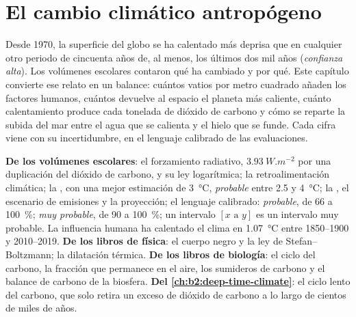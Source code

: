 \chapter{El cambio climático antropógeno}\label{ch:b2:anthropogenic-climate-change}

Desde 1970, la superficie del globo se ha calentado más deprisa que en cualquier otro periodo de cincuenta años de, al menos,
los últimos dos mil años (\emph{confianza alta}). Los volúmenes escolares contaron qué ha cambiado y
por qué. Este capítulo convierte ese relato en un balance: cuántos vatios por metro cuadrado añaden los
factores humanos, cuántos devuelve al espacio el planeta más caliente, cuánto calentamiento produce cada tonelada de dióxido
de carbono y cómo se reparte la subida del mar entre el agua que se calienta y el hielo que se funde. Cada cifra
viene con su incertidumbre, en el lenguaje calibrado de las evaluaciones.

\begin{recall}
\textbf{De los volúmenes escolares}: el forzamiento radiativo, $\qty{3.93}{W.m^{-2}}$ por una duplicación del
dióxido de carbono, y su ley logarítmica; la retroalimentación climática; la , con una mejor
estimación de \qty{3}{\celsius}, \emph{probable} entre 2.5 y \qty{4}{\celsius}; la , el escenario de emisiones
y la proyección; el lenguaje calibrado: \emph{probable}, de 66 a \qty{100}{\percent}; \emph{muy
probable}, de 90 a \qty{100}{\percent}; un intervalo $[x \text{ a } y]$ es un intervalo muy probable. La influencia
humana ha calentado el clima en \qty{1.07}{\celsius} entre 1850--1900 y 2010--2019.
\textbf{De los libros de física}: el cuerpo negro y la ley de Stefan--Boltzmann; la dilatación térmica.
\textbf{De los libros de biología}: el ciclo del carbono, la fracción que permanece en el aire, los sumideros de carbono y el
balance de carbono de la biosfera. \textbf{Del \cref{ch:b2:deep-time-climate}}: el ciclo lento del carbono,
que solo retira un exceso de dióxido de carbono a lo largo de cientos de miles de años.
\end{recall}

